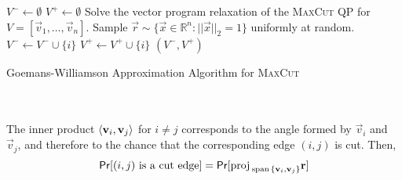         \begin{algorithm}[H] 
            \begin{algorithmic}[1]
                    \State \(V^-\gets \emptyset\)
                    \State \(V^+\gets \emptyset\)
                    \State Solve the vector program relaxation of the \textsc{MaxCut} QP for \(V=[\vec{v}_1,\ldots,\vec{v}_n]\).
                    \State Sample \(\vec{r}\sim\{\vec{x}\in\mathbb{R}^n:||\vec{x}||_2=1\}\) uniformly at random.
                            \State \(V^-\gets V^-\cup\{i\}\)
                        \Else 
                            \State \(V^+\gets V^+\cup\{i\}\)
                        \EndIf
                    \EndFor
                    \State \Return \((V^-,V^+)\)
                \EndProcedure 
            \end{algorithmic}
            \caption{Goemans-Williamson Approximation Algorithm for \textsc{MaxCut}}
            \label{alg:geomans-williamson}
        \end{algorithm}
        \vphantom
        \\
        \\
        The inner product \(\left\langle \mathbf{v}_i,\mathbf{v}_j\right\rangle\) for \(i\neq j\) corresponds to the angle formed by \(\vec{v}_i\) and \(\vec{v}_j\), and therefore to the chance that the corresponding edge \((i,j)\) is cut. Then,
        \begin{align*}
            \mathsf{Pr}[(i,j)\text{ is a cut edge}]=\mathsf{Pr}[\text{proj\,}_{\text{span\,}\{\mathbf{v}_i,\mathbf{v}_j\}}\mathbf{r}]
        \end{align*}
